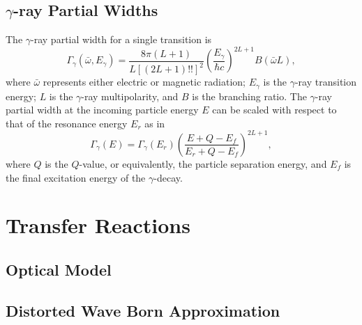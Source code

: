 \subsection{$\gamma$-ray Partial Widths}
The $\gamma$-ray partial width for a single transition is
\begin{equation}
\Gamma_{\gamma}(\bar{\omega}, E_{\gamma}) = \frac{8 \pi (L + 1)}{L\left[(2L + 1)!!\right]^{2}} \left(\frac{E_{\gamma}}{\hbar c}\right)^{2L+1} B(\bar{\omega}L),
\end{equation}
where $\bar{\omega}$ represents either electric or magnetic radiation; $E_{\gamma}$ is the $\gamma$-ray transition energy; $L$ is the $\gamma$-ray multipolarity, and $B$ is the branching ratio. The $\gamma$-ray partial width at the incoming particle energy $E$ can be scaled with respect to that of the resonance energy $E_{r}$ as in
\begin{equation}
\Gamma_{\gamma}(E) = \Gamma_{\gamma}(E_{r}) \left(\frac{E + Q - E_{f}}{E_{r} + Q - E_{f}}\right)^{2L+1},
\end{equation}
where $Q$ is the $Q$-value, or equivalently, the particle separation energy, and $E_{f}$ is the final excitation energy of the $\gamma$-decay.

\section{Transfer Reactions} \label{sec:transfer_reactions}


\subsection{Optical Model} \label{subsec:Optical_Model}



\subsection{Distorted Wave Born Approximation} \label{subsec:DWBA}




